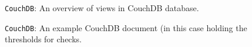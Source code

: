 \documentclass[12pt]{article}
\begin{document}
\begin{figure}
\centering
\noindent{}
  \caption{\centering \texttt{CouchDB}: An overview of views in CouchDB database.}
  \label{fig:couch}
\end{figure}

\begin{figure}
\centering
\noindent{}
  \caption{\centering \texttt{CouchDB}: An example CouchDB document (in this case holding the thresholds for checks.}
  \label{fig:couchdoc}
\end{figure}
\end{document}
